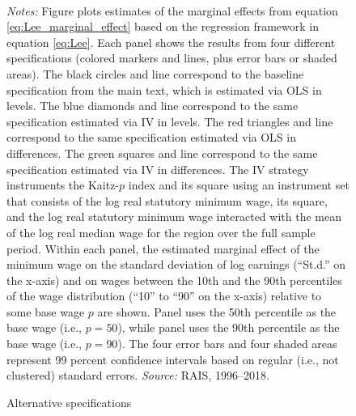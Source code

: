 \begin{figure}[!htb]
  \centering
  \caption{\label{app_fig_alt_specs}Alternative specifications}
  \prefigvspace
  \hspace*{\fill}%
  \centerhfill[\qquad\qquad\qquad\qquad\qquad]
  \hspace*{\fill}
  \\
  \postfigvspace
  \begin{minipage}[t]{1\columnwidth}%
    \begin{spacing}{0.75}
      \emph{\scriptsize{}Notes:}{\scriptsize{} Figure plots estimates of the marginal effects from equation \eqref{eq:Lee_marginal_effect} based on the regression framework in equation \eqref{eq:Lee}. Each panel shows the results from four different specifications (colored markers and lines, plus error bars or shaded areas). The black circles and line correspond to the baseline specification from the main text, which is estimated via OLS in levels. The blue diamonds and line correspond to the same specification estimated via IV in levels. The red triangles and line correspond to the same specification estimated via OLS in differences. The green squares and line correspond to the same specification estimated via IV in differences. The IV strategy instruments the Kaitz-$p$ index and its square using an instrument set that consists of the log real statutory minimum wage, its square, and the log real statutory minimum wage interacted with the mean of the log real median wage for the region over the full sample period. Within each panel, the estimated marginal effect of the minimum wage on the standard deviation of log earnings (``St.d.'' on the x-axis) and on wages between the 10th and the 90th percentiles of the wage distribution (``10'' to ``90'' on the x-axis) relative to some base wage $p$ are shown. Panel  uses the 50th percentile as the base wage (i.e., $p=50$), while panel  uses the 90th percentile as the base wage (i.e., $p=90$). The four error bars and four shaded areas represent 99 percent confidence intervals based on regular (i.e., not clustered) standard errors. %
      \emph{\scriptsize{}Source: } RAIS, 1996--2018.}
    \end{spacing}
  \end{minipage}
\end{figure}




